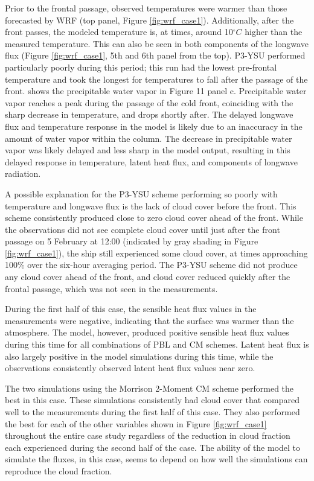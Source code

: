 Prior to the frontal passage, observed temperatures were warmer than those forecasted by WRF (top panel, Figure \ref{fig:wrf_case1}). Additionally, after the front passes, the modeled temperature is, at times, around 10$^{\circ}C$ higher than the measured temperature. This can also be seen in both components of the longwave flux (Figure \ref{fig:wrf_case1}, 5th and 6th panel from the top). P3-YSU performed particularly poorly during this period; this run had the lowest pre-frontal temperature and took the longest for temperatures to fall after the passage of the front. \citet{walden:2017} shows the precipitable water vapor in Figure 11 panel c. Precipitable water vapor reaches a peak during the passage of the cold front, coinciding with the sharp decrease in temperature, and drops shortly after. The delayed longwave flux and temperature response in the model is likely due to an inaccuracy in the amount of water vapor within the column. The decrease in precipitable water vapor was likely delayed and less sharp in the model output, resulting in this delayed response in temperature, latent heat flux, and components of longwave radiation. 

A possible explanation for the P3-YSU scheme performing so poorly with temperature and longwave flux is the lack of cloud cover before the front. This scheme consistently produced close to zero cloud cover ahead of the front. While the observations did not see complete cloud cover until just after the front passage on 5 February at 12:00 (indicated by gray shading in Figure \ref{fig:wrf_case1}), the ship still experienced some cloud cover, at times approaching 100$\%$ over the six-hour averaging period. The P3-YSU scheme did not produce any cloud cover ahead of the front, and cloud cover reduced quickly after the frontal passage, which was not seen in the measurements. 

During the first half of this case, the sensible heat flux values in the measurements were negative, indicating that the surface was warmer than the atmosphere. The model, however, produced positive sensible heat flux values during this time for all combinations of PBL and CM schemes. Latent heat flux is also largely positive in the model simulations during this time, while the observations consistently observed latent heat flux values near zero. 

The two simulations using the Morrison 2-Moment CM scheme performed the best in this case. These simulations consistently had cloud cover that compared well to the measurements during the first half of this case. They also performed the best for each of the other variables shown in Figure \ref{fig:wrf_case1} throughout the entire case study regardless of the reduction in cloud fraction each experienced during the second half of the case. The ability of the model to simulate the fluxes, in this case, seems to depend on how well the simulations can reproduce the cloud fraction.

